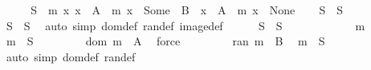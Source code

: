 \begin{isabellebody}
%
\isadelimproof
%
\endisadelimproof
%
\isatagproof
{}\isamarkupfalse%
\ {\isacharminus}{\kern0pt}\isanewline
\ \ \isamarkupfalse%
\ {\isacharquery}{\kern0pt}S{\isacharprime}{\kern0pt}\ {\isacharequal}{\kern0pt}\ {\isachardoublequoteopen}{\isacharbraceleft}{\kern0pt}m{\isachardot}{\kern0pt}\ {\isasymforall}x{\isachardot}{\kern0pt}\ {\isacharparenleft}{\kern0pt}x\ {\isasymin}\ A\ {\isasymlongrightarrow}\ m\ x\ {\isasymin}\ Some\ {\isacharbackquote}{\kern0pt}\ B{\isacharparenright}{\kern0pt}\ {\isasymand}\ {\isacharparenleft}{\kern0pt}x\ {\isasymnotin}\ A\ {\isasymlongrightarrow}\ m\ x\ {\isacharequal}{\kern0pt}\ None{\isacharparenright}{\kern0pt}{\isacharbraceright}{\kern0pt}{\isachardoublequoteclose}\isanewline
\ \ \isamarkupfalse%
\ {\isachardoublequoteopen}{\isacharquery}{\kern0pt}S\ {\isacharequal}{\kern0pt}\ {\isacharquery}{\kern0pt}S{\isacharprime}{\kern0pt}{\isachardoublequoteclose}\isanewline
\ \ \isamarkupfalse%
\isanewline
\ \ \ \ \isamarkupfalse%
\ {\isachardoublequoteopen}{\isacharquery}{\kern0pt}S\ {\isasymsubseteq}\ {\isacharquery}{\kern0pt}S{\isacharprime}{\kern0pt}{\isachardoublequoteclose}\ \isamarkupfalse%
\ {\isacharparenleft}{\kern0pt}auto\ simp{\isacharcolon}{\kern0pt}\ dom{\isacharunderscore}{\kern0pt}def\ ran{\isacharunderscore}{\kern0pt}def\ image{\isacharunderscore}{\kern0pt}def{\isacharparenright}{\kern0pt}\isanewline
\ \ \ \ \isamarkupfalse%
\ {\isachardoublequoteopen}{\isacharquery}{\kern0pt}S{\isacharprime}{\kern0pt}\ {\isasymsubseteq}\ {\isacharquery}{\kern0pt}S{\isachardoublequoteclose}\isanewline
\ \ \ \ \isamarkupfalse%
\isanewline
\ \ \ \ \ \ \isamarkupfalse%
\ m\ \isamarkupfalse%
\ {\isachardoublequoteopen}m\ {\isasymin}\ {\isacharquery}{\kern0pt}S{\isacharprime}{\kern0pt}{\isachardoublequoteclose}\isanewline
\ \ \ \ \ \ \isamarkupfalse%
\ {}{\isacharcolon}{\kern0pt}\ {\isachardoublequoteopen}dom\ m\ {\isacharequal}{\kern0pt}\ A{\isachardoublequoteclose}\ \isamarkupfalse%
\ force\isanewline
\ \ \ \ \ \ \isamarkupfalse%
\ {}{\isacharcolon}{\kern0pt}\ {\isachardoublequoteopen}ran\ m\ {\isasymsubseteq}\ B{\isachardoublequoteclose}\ \isamarkupfalse%
\ {\isacartoucheopen}m\ {\isasymin}\ {\isacharquery}{\kern0pt}S{\isacharprime}{\kern0pt}{\isacartoucheclose}\ \isamarkupfalse%
\ {\isacharparenleft}{\kern0pt}auto\ simp{\isacharcolon}{\kern0pt}\ dom{\isacharunderscore}{\kern0pt}def\ ran{\isacharunderscore}{\kern0pt}def{\isacharparenright}{\kern0pt}\isanewline

\end{isabellebody}
